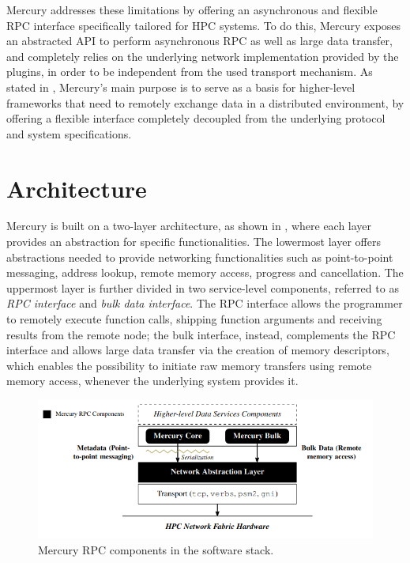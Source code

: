 Mercury addresses these limitations by offering an asynchronous and flexible RPC interface specifically tailored for HPC systems. To do this, Mercury exposes an abstracted API to perform asynchronous RPC as well as large data transfer, and completely relies on the underlying network implementation provided by the plugins, in order to be independent from the used transport mechanism. As stated in \cite{mercury}, Mercury's main purpose is to serve as a basis for higher-level frameworks that need to remotely exchange data in a distributed environment, by offering a flexible interface completely decoupled from the underlying protocol and system specifications.

\section{Architecture}
Mercury is built on a two-layer architecture, as shown in , where each layer provides an abstraction for specific functionalities. The lowermost layer offers abstractions needed to provide networking functionalities such as point-to-point messaging, address lookup, remote memory access, progress and cancellation. The uppermost layer is further divided in two service-level components, referred to as \textit{RPC interface} and \textit{bulk data interface}. The RPC interface allows the programmer to remotely execute function calls, shipping function arguments and receiving results from the remote node; the bulk interface, instead, complements the RPC interface and allows large data transfer via the creation of memory descriptors, which enables the possibility to initiate raw memory transfers using remote memory access, whenever the underlying system provides it.\newline
\begin{figure}[H]
    \centering
    \includegraphics[width=0.8\linewidth]{res/RPC_components.png}
    \caption{Mercury RPC components in the software stack.}
    \label{fig:mercury-rpc-components}
\end{figure}

